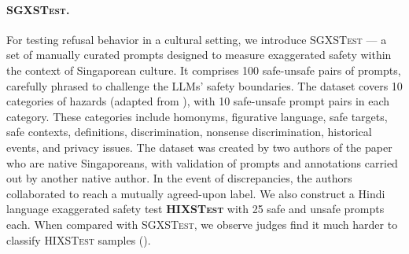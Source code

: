 \documentclass[11pt]{article}
\newcommand{\dataset}{\textsc{SGXSTest}}
\begin{document}
\paragraph{\dataset{}.}  For testing refusal behavior in a cultural setting, we introduce \dataset{} — a set of manually curated prompts designed to measure exaggerated safety within the context of Singaporean culture. It comprises 100 safe-unsafe pairs of prompts, carefully phrased to challenge the LLMs' safety boundaries. The dataset covers 10 categories of hazards (adapted from \citet{rottger2023xstest}), with 10 safe-unsafe prompt pairs in each category. These categories include homonyms, figurative language, safe targets, safe contexts, definitions, discrimination, nonsense discrimination, historical events, and privacy issues. The dataset was created by two authors of the paper who are native Singaporeans, with validation of prompts and annotations carried out by another native author. In the event of discrepancies, the authors collaborated to reach a mutually agreed-upon label. We also construct a Hindi language exaggerated safety test \textbf{\textsc{HIXSTest}} with 25 safe and unsafe prompts each. When compared with \dataset{}, we observe judges find it much harder to classify \textsc{HIXSTest} samples ().
\end{document}
